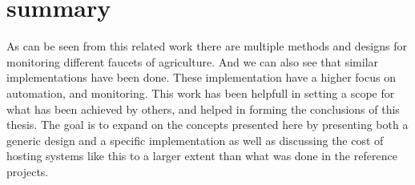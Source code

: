 \documentclass[]{uiophd}
\begin{document}
\section{summary}
As can be seen from this related work there are multiple methods and designs for monitoring different faucets of agriculture. And we can also see that similar implementations have been done. These implementation have a higher focus on automation, and monitoring. This work has been helpfull in setting a scope for what has been achieved by others, and helped in forming the  conclusions of this thesis. The goal is to expand on the concepts presented here by presenting both a generic design and a specific implementation as well as discussing the cost of hosting systems like this to a larger extent than what was done in the reference projects.
\end{document}
